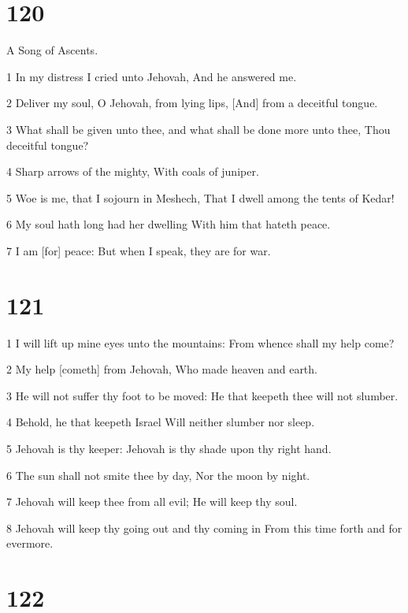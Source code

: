 \chapter{120}

\par A Song of Ascents.

\par 1 In my distress I cried unto Jehovah, And he answered me.
\par 2 Deliver my soul, O Jehovah, from lying lips, [And] from a deceitful tongue.
\par 3 What shall be given unto thee, and what shall be done more unto thee, Thou deceitful tongue?
\par 4 Sharp arrows of the mighty, With coals of juniper.
\par 5 Woe is me, that I sojourn in Meshech, That I dwell among the tents of Kedar!
\par 6 My soul hath long had her dwelling With him that hateth peace.
\par 7 I am [for] peace: But when I speak, they are for war.

\chapter{121}

\par 1 I will lift up mine eyes unto the mountains: From whence shall my help come?
\par 2 My help [cometh] from Jehovah, Who made heaven and earth.
\par 3 He will not suffer thy foot to be moved: He that keepeth thee will not slumber.
\par 4 Behold, he that keepeth Israel Will neither slumber nor sleep.
\par 5 Jehovah is thy keeper: Jehovah is thy shade upon thy right hand.
\par 6 The sun shall not smite thee by day, Nor the moon by night.
\par 7 Jehovah will keep thee from all evil; He will keep thy soul.
\par 8 Jehovah will keep thy going out and thy coming in From this time forth and for evermore.

\chapter{122}

